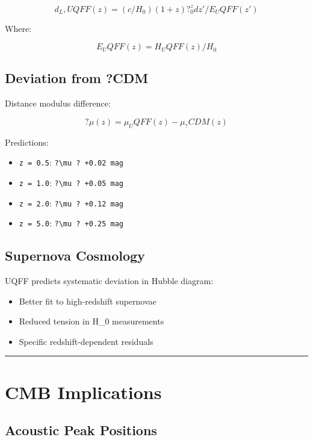 \documentclass[12pt,a4paper]{article}
\begin{document}
\begin{equation}
d_L,UQFF(z) = (c/H_0)(1+z) ?_0^z dz'/E_UQFF(z')
\end{equation}

Where:

\begin{equation}
E_UQFF(z) = H_UQFF(z)/H_0
\end{equation}

\subsection{Deviation from ?CDM}

Distance modulus difference:

\begin{equation}
?\mu(z) = \mu_UQFF(z) - \mu_?CDM(z)
\end{equation}

Predictions:

\begin{itemize}
  \item \texttt{z = 0.5}: \texttt{?\textbackslash mu ? +0.02 mag}
  \item \texttt{z = 1.0}: \texttt{?\textbackslash mu ? +0.05 mag}
  \item \texttt{z = 2.0}: \texttt{?\textbackslash mu ? +0.12 mag}
  \item \texttt{z = 5.0}: \texttt{?\textbackslash mu ? +0.25 mag}
\end{itemize}

\subsection{Supernova Cosmology}

UQFF predicts systematic deviation in Hubble diagram:

\begin{itemize}
  \item Better fit to high-redshift supernovae
  \item Reduced tension in H\_0 measurements
  \item Specific redshift-dependent residuals
\end{itemize}

\medskip\hrule\medskip

\section{CMB Implications}

\subsection{Acoustic Peak Positions}
\end{document}
